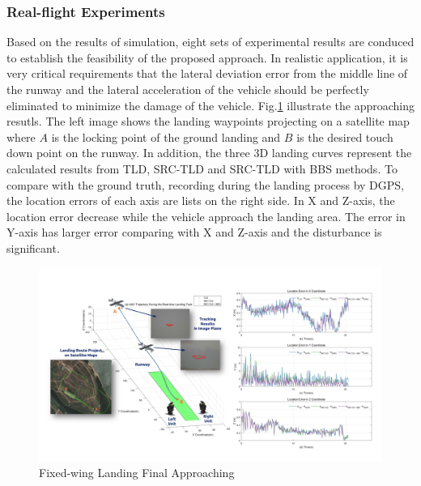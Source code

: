 \subsubsection{Real-flight Experiments}
Based on the results of simulation, eight sets of experimental results are conduced to establish the feasibility of the proposed approach. In realistic application, it is very critical requirements that the lateral deviation error from the middle line of the runway and the lateral acceleration of the vehicle should be perfectly eliminated to minimize the damage of the vehicle. Fig.\ref{fig:sci02_landing_results_big} illustrate the approaching resutls. The left image shows the landing waypoints projecting on a satellite map where $A$ is the locking point of the ground landing and $B$ is the desired touch down point on the runway. In addition, the three 3D landing curves represent the calculated results from TLD, SRC-TLD and SRC-TLD with BBS methods. To compare with the ground truth, recording during the landing process by DGPS, the location errors of each axis are lists on the right side. In X and Z-axis, the location error decrease while the vehicle approach the landing area. The error in Y-axis has larger error comparing with X and Z-axis and the disturbance is significant.

\begin{figure}[!th]
	\centering
	\includegraphics[width=\textwidth]{Figs/sci02_landing_results_big.pdf}	
	\caption{Fixed-wing Landing Final Approaching}
	\label{fig:sci02_landing_results_big}
\end{figure}


